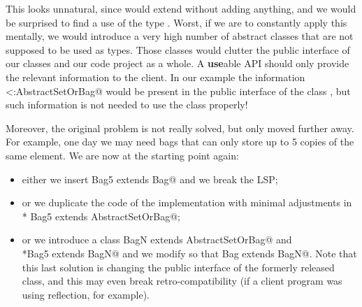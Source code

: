 This looks unnatural, since \Q@Set@ would extend \Q@AbstractSetOrBag@ without adding anything,
and we would be surprised to find a use of the type \Q@AbstractSetOrBag@.
Worst, if we are to constantly apply this mentally, we would introduce a very high number
of abstract classes that are not supposed to be used as types. Those classes would clutter the 
public interface of our classes and our code project as a whole.
A \textbf{use}able API should only provide the relevant information to the client.
In our example the information \Q@Set<:AbstractSetOrBag@ would be present in the public interface
of the class \Q@Set@, but such information is not needed to use the class properly!

Moreover, the original problem is not really solved, but only moved 
further away. For example, one day  we may need bags that can only store up to 5 copies of the same element.
We are now at the starting point again:
\begin{itemize}
\item either we insert \Q@class Bag5 extends Bag@ and we break the LSP; 
\item or we duplicate the code of the \Q@Bag@ implementation with minimal
  adjustments in \\* \Q@class Bag5 extends AbstractSetOrBag@;
\item or we introduce a
\Q@abstract class BagN extends AbstractSetOrBag@ and \\*\Q@class Bag5 extends BagN@
and we modify \Q@Bag@ so that  \Q@class Bag extends BagN@.
Note that this last solution is changing the public interface of the formerly released \Q@Bag@ class, and
this may even break retro-compatibility (if a client program was using
reflection, for example).
\end{itemize}

